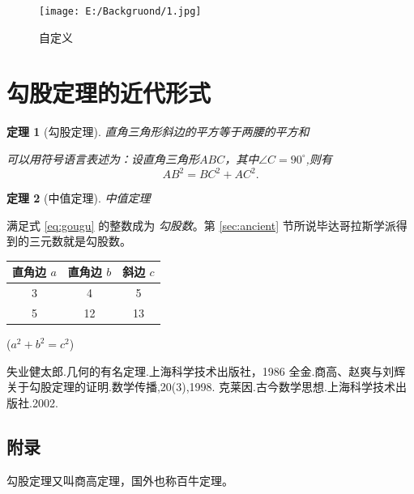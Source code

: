 \documentclass{ctexart}[UTF-8]        %
\newtheorem{thm}{定理}               %
\newcommand\degree{^\circ}           %
\begin{document}
\begin{figure}[!ht]\centering
    \texttt{[image: E:/Backgruond/1.jpg]}
    \caption{自定义}
\end{figure}


\clearpage
\section{勾股定理的近代形式}



\begin{thm}[\small 勾股定理]    %
    \small 直角三角形斜边的平方等于两腰的平方和

    \small 可以用符号语言表述为：设直角三角形$ABC$，其中$\angle C=90 \degree$,则有
    \begin{equation}\label{eq:gougu}   %
        AB^2=BC^2+AC^2.
    \end{equation}
\end{thm}


\begin{thm}[\small 中值定理] 
    \small 中值定理
\end{thm}

\small 满足式 \eqref{eq:gougu} 的整数成为 \emph{勾股数}。第 \ref{sec:ancient} 节所说毕达哥拉斯学派得到的三元数就是勾股数。

\vspace{3mm}    %
\begin{tabular}{|c|c|c|}\hline   %
    \small 直角边 $a$ & 直角边 $b$ & 斜边 $c$ \\\hline  %
    3 & 4 & 5 \\\hline
    5 & 12 & 13 \\\hline
\end{tabular}
\small($a^2+b^2=c^2$)

\clearpage
\begin{thebibliography}{99}   %
     失业健太郎.几何的有名定理.上海科学技术出版社，1986
    全金.商高、赵爽与刘辉关于勾股定理的证明.数学传播,20(3),1998.
    克莱因.古今数学思想.上海科学技术出版社.2002.
\end{thebibliography}



\begin{appendix}          %
\section{附录} %
    \small 勾股定理又叫商高定理，国外也称百牛定理。    
\end{appendix}
\end{document}
